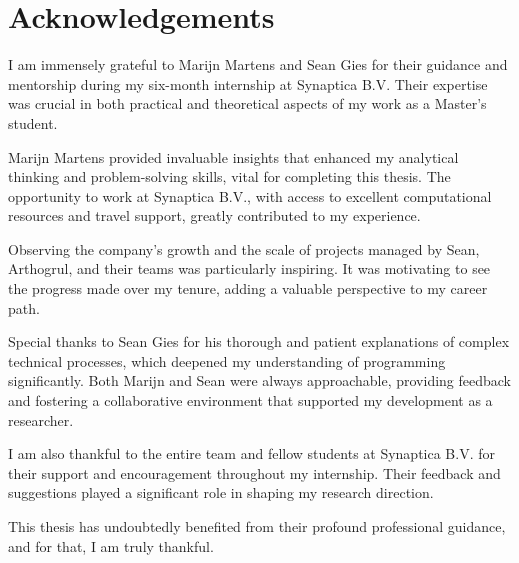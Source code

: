 \section*{Acknowledgements}
I am immensely grateful to Marijn Martens and Sean Gies for their guidance and
mentorship during my six-month internship at Synaptica B.V. Their expertise
was crucial in both practical and theoretical aspects of my work as a
Master's student.

Marijn Martens provided invaluable insights that enhanced my analytical thinking
and problem-solving skills, vital for completing this thesis. The opportunity to
work at Synaptica B.V., with access to excellent computational resources and
travel support, greatly contributed to my experience.

Observing the company's growth and the scale of projects managed by Sean,
Arthogrul, and their teams was particularly inspiring. It was motivating to see
the progress made over my tenure, adding a valuable perspective to my career
path.

Special thanks to Sean Gies for his thorough and patient explanations of complex
technical processes, which deepened my understanding of programming significantly.
Both Marijn and Sean were always approachable, providing feedback and fostering
a collaborative environment that supported my development as a researcher.

I am also thankful to the entire team and fellow students at Synaptica B.V. for
their support and encouragement throughout my internship. Their feedback
and suggestions played a significant role in shaping my research direction.

This thesis has undoubtedly benefited from their profound professional guidance,
and for that, I am truly thankful.